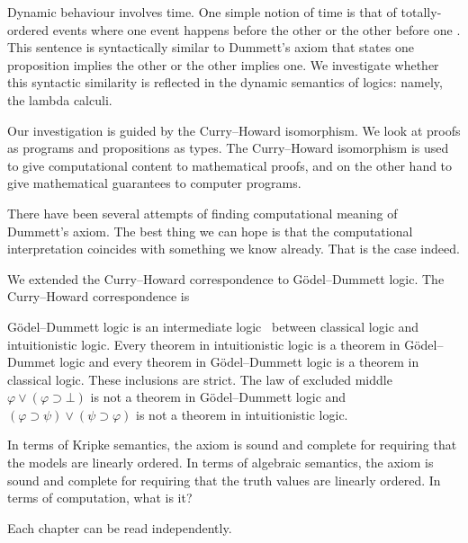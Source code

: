 Dynamic behaviour involves time.
One simple notion of time is that of totally-ordered events where
one event happens before the other or the other before one .
This sentence is syntactically similar to Dummett's axiom that states
one proposition implies the other or the other implies one.
We investigate whether this syntactic similarity is reflected
in the dynamic semantics of logics: namely, the lambda calculi.


Our investigation is guided by the Curry--Howard isomorphism.
We look at proofs as programs and propositions as types.
The Curry--Howard isomorphism is used to give computational content
to mathematical proofs, and on the other hand to give mathematical
guarantees to computer programs.


There have been several attempts of finding computational meaning of
Dummett's axiom.  
The best thing we can hope is that the computational
interpretation coincides with something we know already.
That is the case indeed.

We extended the Curry--Howard correspondence to G\"odel--Dummett logic.
The Curry--Howard correspondence is 

G\"odel--Dummett logic is an intermediate logic~\citep{umezawa} between
classical logic and intuitionistic logic.  Every theorem in
intuitionistic logic is a theorem in G\"odel--Dummet logic and every
theorem in G\"odel--Dummett logic is a theorem in classical logic.
These inclusions are strict.  The law of excluded middle
$\varphi\vee(\varphi\supset \bot)$ is not a theorem in G\"odel--Dummett
logic and $(\varphi\supset\psi)\vee(\psi\supset\varphi)$ is not a
theorem in intuitionistic logic.

In terms of Kripke semantics, the axiom is sound and complete for
requiring that the models are linearly ordered.
In terms of algebraic semantics, the axiom is sound and complete for
requiring that the truth values are linearly ordered.
In terms of computation, what is it?

Each chapter can be read independently.

\subsection{}
\subsection{}
\subsection{}

